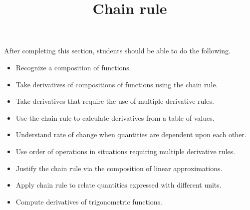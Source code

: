 \documentclass{ximera}
\title{Chain rule}
\begin{document}
\begin{abstract}
\end{abstract}

\maketitle

\begin{sectionOutcomes}

After completing this section, students should be able to do the following.

\begin{itemize}
	\item Recognize a composition of functions.
	\item Take derivatives of compositions of functions using the chain rule.
	\item Take derivatives that require the use of multiple derivative rules.
	\item Use the chain rule to calculate derivatives from a table of values.
	\item Understand rate of change when quantities are dependent upon each other.
	\item Use order of operations in situations requiring multiple derivative rules.
        \item Justify the chain rule via the composition of linear approximations.
        \item Apply chain rule to relate quantities expressed with different units.
        \item Compute derivatives of trigonometric functions.
\end{itemize}

\end{sectionOutcomes}
\end{document}
